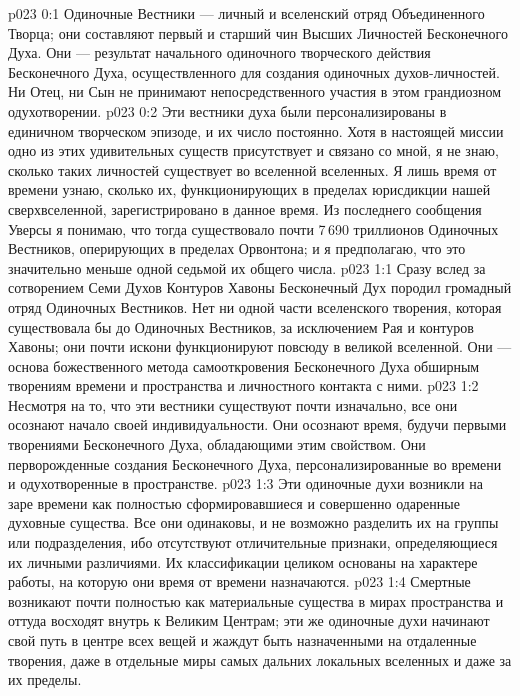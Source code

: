 \author{Божественный Советник}
\vs p023 0:1 Одиночные Вестники --- личный и вселенский отряд Объединенного Творца; они составляют первый и старший чин Высших Личностей Бесконечного Духа. Они --- результат начального одиночного творческого действия Бесконечного Духа, осуществленного для создания одиночных духов\hyp{}личностей. Ни Отец, ни Сын не принимают непосредственного участия в этом грандиозном одухотворении.
\vs p023 0:2 Эти вестники духа были персонализированы в единичном творческом эпизоде, и их число постоянно. Хотя в настоящей миссии одно из этих удивительных существ присутствует и связано со мной, я не знаю, сколько таких личностей существует во вселенной вселенных. Я лишь время от времени узнаю, сколько их, функционирующих в пределах юрисдикции нашей сверхвселенной, зарегистрировано в данное время. Из последнего сообщения Уверсы я понимаю, что тогда существовало почти 7\,690 триллионов Одиночных Вестников, оперирующих в пределах Орвонтона; и я предполагаю, что это значительно меньше одной седьмой их общего числа.
\vs p023 1:1 Сразу вслед за сотворением Семи Духов Контуров Хавоны Бесконечный Дух породил громадный отряд Одиночных Вестников. Нет ни одной части вселенского творения, которая существовала бы до Одиночных Вестников, за исключением Рая и контуров Хавоны; они почти искони функционируют повсюду в великой вселенной. Они --- основа божественного метода самооткровения Бесконечного Духа обширным творениям времени и пространства и личностного контакта с ними.
\vs p023 1:2 Несмотря на то, что эти вестники существуют почти изначально, все они осознают начало своей индивидуальности. Они осознают время, будучи первыми творениями Бесконечного Духа, обладающими этим свойством. Они перворожденные создания Бесконечного Духа, персонализированные во времени и одухотворенные в пространстве.
\vs p023 1:3 Эти одиночные духи возникли на заре времени как полностью сформировавшиеся и совершенно одаренные духовные существа. Все они одинаковы, и не возможно разделить их на группы или подразделения, ибо отсутствуют отличительные признаки, определяющиеся их личными различиями. Их классификации целиком основаны на характере работы, на которую они время от времени назначаются.
\vs p023 1:4 Смертные возникают почти полностью как материальные существа в мирах пространства и оттуда восходят внутрь к Великим Центрам; эти же одиночные духи начинают свой путь в центре всех вещей и жаждут быть назначенными на отдаленные творения, даже в отдельные миры самых дальних локальных вселенных и даже за их пределы.
